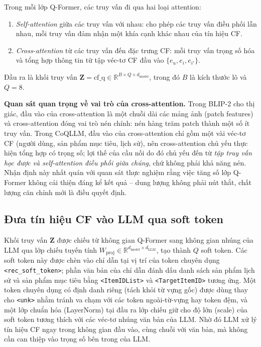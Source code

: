 Trong mỗi lớp Q-Former, các truy vấn đi qua hai loại attention:

\begin{enumerate}
    \item \textit{Self-attention} giữa các truy vấn với nhau: cho phép các truy vấn điều
    phối lẫn nhau, mỗi truy vấn đảm nhận một khía cạnh khác nhau của tín hiệu CF.

    \item \textit{Cross-attention} từ các truy vấn đến đặc trưng CF: mỗi truy vấn trọng
    số hóa và tổng hợp thông tin từ tập véc-tơ CF đầu vào $\{e_u, e_i, e_{i'}\}$.
\end{enumerate}

Đầu ra là khối truy vấn $\mathbf{Z} = \text{cf\_q} \in \mathbb{R}^{B \times Q \times
d_{\text{model}}}$, trong đó $B$ là kích thước lô và $Q = 8$.

\textbf{Quan sát quan trọng về vai trò của cross-attention.} Trong BLIP-2 cho thị giác,
đầu vào của cross-attention là một chuỗi dài các mảng ảnh (patch features) và
cross-attention đóng vai trò nén chính: nén hàng trăm patch thành một số ít truy vấn.
Trong CoQLLM, đầu vào của cross-attention chỉ gồm một vài véc-tơ CF (người dùng, sản phẩm
mục tiêu, lịch sử), nên cross-attention chủ yếu thực hiện tổng hợp có trọng số; lợi thế
của cầu nối do đó chủ yếu đến từ \textit{tập truy vấn học được và self-attention điều phối
giữa chúng}, chứ không phải khả năng nén. Nhận định này nhất quán với quan sát thực nghiệm
rằng việc tăng số lớp Q-Former không cải thiện đáng kể kết quả -- dung lượng không phải nút
thắt, chất lượng căn chỉnh mới là điều quyết định.

\subsection{Đưa tín hiệu CF vào LLM qua soft token}
\label{ssec:hai-duong}

Khối truy vấn $\mathbf{Z}$ được chiếu từ không gian Q-Former sang không gian nhúng của LLM
qua lớp chiếu tuyến tính $W_{\text{proj}} \in \mathbb{R}^{d_{\text{model}} \times
d_{\text{LLM}}}$, tạo thành $Q$ soft token. Các soft token này được chèn vào chỉ dẫn tại
vị trí của token chuyên dụng \verb|<rec_soft_token>|; phần văn bản của chỉ dẫn đánh dấu
danh sách sản phẩm lịch sử và sản phẩm mục tiêu bằng \verb|<ItemIDList>| và
\verb|<TargetItemID>| tương ứng. Một token chuyên dụng có định danh riêng (tách khỏi từ
vựng gốc) được dùng thay cho \verb|<unk>| nhằm tránh va chạm với các token ngoài-từ-vựng
hay token đệm, và một lớp chuẩn hóa (LayerNorm) tại đầu ra lớp chiếu giữ cho độ lớn (scale)
của soft token tương thích với các véc-tơ nhúng văn bản của LLM. Nhờ đó LLM xử lý tín hiệu
CF ngay trong không gian đầu vào, cùng chuỗi với văn bản, mà không cần can thiệp vào trọng
số bên trong của LLM.

